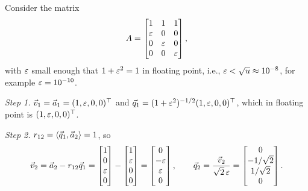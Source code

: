 \begin{example}
  \label{ex:cgs-lauchli}
  Consider the matrix
  \begin{equation}
    A = \begin{bmatrix} 1 & 1 & 1 \\ \varepsilon & 0 & 0 \\ 0 & \varepsilon & 0 \\ 0 & 0 & \varepsilon \end{bmatrix},
  \end{equation}
  with $\varepsilon$ small enough that $1 + \varepsilon^2 = 1$ in floating point, i.e., $\varepsilon < \sqrt{u} \approx 10^{-8}$, for example $\varepsilon = 10^{-10}$.

  \emph{Step 1.} $\vec{v}_1 = \vec{a}_1 = (1, \varepsilon, 0, 0)^\top$ and $\vec{q}_1 = (1 + \varepsilon^2)^{-1/2}(1, \varepsilon, 0, 0)^\top$, which in floating point is $(1, \varepsilon, 0, 0)^\top$.

  \emph{Step 2.} $r_{12} = \left\langle \vec{q}_1, \vec{a}_2 \right\rangle = 1$, so
  \begin{equation}
    \vec{v}_2 = \vec{a}_2 - r_{12}\vec{q}_1 = \begin{bmatrix} 1 \\ 0 \\ \varepsilon \\ 0 \end{bmatrix} - \begin{bmatrix} 1 \\ \varepsilon \\ 0 \\ 0 \end{bmatrix} = \begin{bmatrix} 0 \\ -\varepsilon \\ \varepsilon \\ 0 \end{bmatrix}, \qquad
    \vec{q}_2 = \frac{\vec{v}_2}{\sqrt{2}\,\varepsilon} = \begin{bmatrix} 0 \\ -1/\sqrt{2} \\ 1/\sqrt{2} \\ 0 \end{bmatrix}.
  \end{equation}


\end{example}
